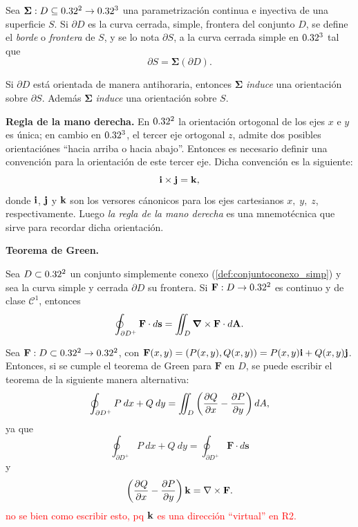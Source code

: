 \begin{definition}
   Sea $\boldsymbol{\Sigma}:D\subseteq0.32^2 \to0.32^3$ una parametrizaci\'on continua e  inyectiva de una superficie $S$. Si $ \partial D$ es la curva cerrada, simple,  frontera del conjunto $D$,  se define el \emph{borde} o \emph{frontera} de $S$, y se lo nota $\partial S$, a la curva cerrada simple en $0.32^3$ tal que 
    \[
        \partial S=\boldsymbol{\Sigma}(\partial D).
    \]
\end{definition}

\begin{obs} \label{sigma_induce}
    Si $\partial D$ est\'a orientada de manera antihoraria, entonces $\boldsymbol{\Sigma}$ \emph{induce} una orientaci\'on sobre $\partial S$. Adem\'as $\boldsymbol{\Sigma}$ \emph{induce} una orientaci\'on sobre $S$.
\end{obs}

\begin{obs}\textbf{Regla de la mano derecha.}
    En $0.32^2$ la orientaci\'on ortogonal de los ejes $x$ e $y$ es \'unica; en cambio en $0.32^3$, el tercer eje ortogonal $z$, admite dos posibles 
    orientaci\'ones ``hacia arriba o hacia abajo''. Entonces es necesario definir una convenci\'on para la orientaci\'on de este tercer eje. Dicha convenci\'on es la siguiente: 
    \[
        \vect{i}\times\vect{j}=\vect{k},
    \]  
    donde $\vect{i}$, $\vect{j}$ y $\vect{k}$ son los versores c\'anonicos para los ejes cartesianos $x,\;y,\;z$, respectivamente. Luego \emph{la regla de la mano derecha} es una mnemot\'ecnica que sirve para recordar dicha orientaci\'on.
    
\end{obs}

\begin{theorem}
    \textbf{Teorema de Green.}
    
    Sea $D\subset 0.32^2$ un conjunto simplemente conexo (\autoref{def:conjuntoconexo_simp}) y sea la curva simple y cerrada  $\partial D$ su frontera. Si  $\mathbf{F}:D\to0.32^2$ es continuo y de clase $\mathcal{C}^1$, entonces
    \[
        \oint_{\partial D^{+}} \mathbf{F}\cdot d\mathbf{s} = \iint_D \grad\times\mathbf{F}\cdot d\mathbf{A}.
    \]
\end{theorem}

\begin{obs} Sea $\mathbf{F}:D\subset 0.32^2\to0.32^2$, con $\mathbf{F}(x,y)=(P(x,y),Q(x,y))=P(x,y)\vect{i}+Q(x,y)\vect{j}$. Entonces, si se cumple el teorema de Green para $\mathbf{F}$ en $D$, se puede escribir el teorema de la siguiente manera alternativa:
\[
    \oint_{\partial D^+}P\:dx+Q\:dy=\iint_D\left(\dfrac{\partial Q}{\partial x}-\dfrac{\partial P}{\partial y}\right)dA,
\]
ya que 
\[
    \oint_{\partial D^+}P\:dx+Q\:dy=\oint_{\partial D^{+}} \mathbf{F}\cdot d\mathbf{s}
\]
y 
\[
    \left(\dif{Q}{x}-\dif{P}{y}\right)\vect{k}=\nabla\times\mathbf{F}.
\]
\textcolor{red}{no se bien como escribir esto, pq $\vect{k}$ es una direcci\'on ``virtual'' en R2.}
\end{obs}

